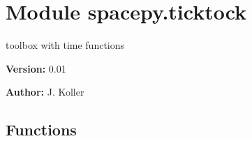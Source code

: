 %
%
%


\section{Module spacepy.ticktock}

    \label{spacepy:ticktock}
toolbox with time functions

\textbf{Version:} 0.01



\textbf{Author:} J. Koller





  \subsection{Functions}

    \label{spacepy:ticktock:getCDF}

    \vspace{0.5ex}


